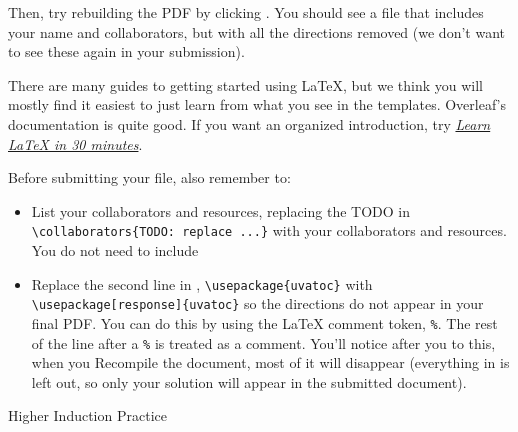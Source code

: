 \documentclass[11pt]{article}
\begin{document}
{Then, try rebuilding the PDF by clicking . You should see a file that includes your name and collaborators, but with all the directions removed (we don't want to see these again in your submission).

There are many guides to getting started using LaTeX, but we think you will mostly find it easiest to just learn from what you see in the templates. Overleaf's documentation is quite good. If you want an organized introduction, try \href{https://www.overleaf.com/learn/latex/Learn_LaTeX_in_30_minutes}{\em Learn LaTeX in 30 minutes}.

Before submitting your  file, also remember to:
\begin{itemize}
\item List your collaborators and resources, replacing the TODO in {\texttt{\textbackslash collaborators\{TODO: replace ...\}}} with your collaborators and resources. You do not need to include

\item Replace the second line in , \texttt{\textbackslash usepackage\{uvatoc\}} with \texttt{\textbackslash usepackage[response]\{uvatoc\}} so the directions do not appear in your final PDF. You can do this by using the LaTeX comment token, {\texttt{\%}}. The rest of the line after a {\texttt{\%}} is treated as a comment. You'll notice after you to this, when you Recompile the document, most of it will disappear (everything in  is left out, so only your solution will appear in the submitted document).
\end{itemize}
}


\begin{problem}
Higher Induction Practice
\end{problem}

\end{document}
